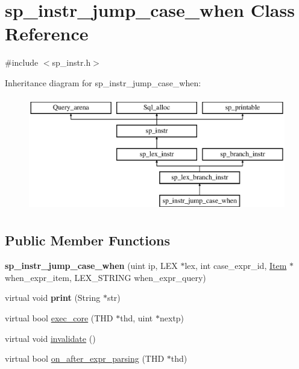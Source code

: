 \hypertarget{classsp__instr__jump__case__when}{}\section{sp\+\_\+instr\+\_\+jump\+\_\+case\+\_\+when Class Reference}
\label{classsp__instr__jump__case__when}


{\ttfamily \#include $<$sp\+\_\+instr.\+h$>$}

Inheritance diagram for sp\+\_\+instr\+\_\+jump\+\_\+case\+\_\+when\+:\begin{figure}[H]
\begin{center}
\leavevmode
\includegraphics[height=5.000000cm]{classsp__instr__jump__case__when}
\end{center}
\end{figure}
\subsection*{Public Member Functions}
\begin{DoxyCompactItemize}
\item 
\mbox{\label{classsp__instr__jump__case__when_a9da51726bd8cadfa96967e893c884b9b}} 
{\bfseries sp\+\_\+instr\+\_\+jump\+\_\+case\+\_\+when} (uint ip, L\+EX $\ast$lex, int case\+\_\+expr\+\_\+id, \mbox{\hyperlink{classItem}{Item}} $\ast$when\+\_\+expr\+\_\+item, L\+E\+X\+\_\+\+S\+T\+R\+I\+NG when\+\_\+expr\+\_\+query)
\item 
\mbox{\label{classsp__instr__jump__case__when_ab44a8df75300d6954cd7551d0fb87e37}} 
virtual void {\bfseries print} (String $\ast$str)
\item 
virtual bool \mbox{\hyperlink{classsp__instr__jump__case__when_aaa1972f676e5c2bb3a55baf61220c5fb}{exec\+\_\+core}} (T\+HD $\ast$thd, uint $\ast$nextp)
\item 
virtual void \mbox{\hyperlink{classsp__instr__jump__case__when_a35195c6200f0d6e87bde67b83f5fd767}{invalidate}} ()
\item 
virtual bool \mbox{\hyperlink{classsp__instr__jump__case__when_a590288e701b813831974c6f6f61884f7}{on\+\_\+after\+\_\+expr\+\_\+parsing}} (T\+HD $\ast$thd)
\end{DoxyCompactItemize}
